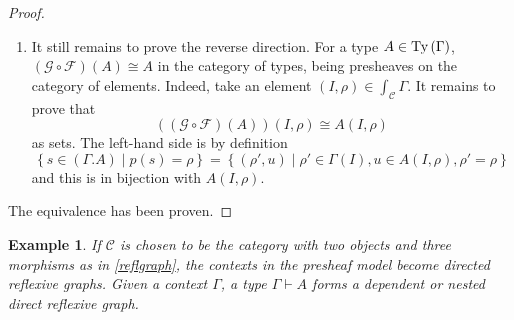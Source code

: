 \documentclass[12pt,a4paper,twoside,xetex]{book} %
\newtheorem{example}[theorem]{Example}
\begin{document}
\begin{proof}
\begin{enumerate}
\item It still remains to prove the reverse direction. For a type $A \in 
\text{Ty}\left(\Gamma\right)$, $(\mathcal{G} \circ \mathcal{F}) (A ) 
\cong A$ in the category of types, being presheaves on the category of 
elements. Indeed, take an element $(I,\rho) \in \int_{\mathcal{C}} \Gamma$. It 
remains to prove that  $$((\mathcal{G} \circ \mathcal{F}) (A )) (I,\rho) \cong 
A(I,\rho) $$ as sets. The left-hand side is by definition $$\left\{ s \in 
(\Gamma . A) \mid p(s) = \rho \right\} = \left\{ (\rho ', u) \mid \rho ' \in 
\Gamma (I), u \in A(I,\rho), \rho ' = \rho \right\}$$ and this is in bijection 
with  $A(I,\rho)$. 


\end{enumerate}
The equivalence has been proven.
\end{proof}

\begin{example}
If $\mathcal{C}$ is chosen to be the category with two 
objects and three morphisms as in \cref{reflgraph}, the contexts in the presheaf model become directed reflexive graphs. Given a 
context $\Gamma$, a type $\Gamma \vdash A$ forms a dependent or nested direct reflexive graph. 
 
\end{example}
\end{document}
